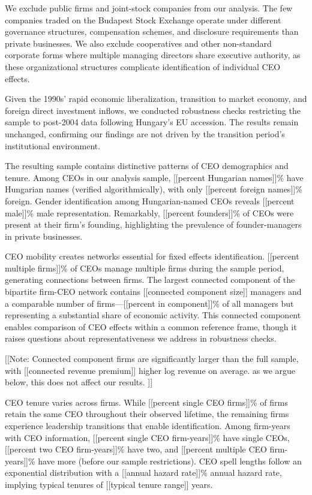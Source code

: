 \documentclass[11pt,a4paper]{article}
\begin{document}
We exclude public firms and joint-stock companies from our analysis. The few companies traded on the Budapest Stock Exchange operate under different governance structures, compensation schemes, and disclosure requirements than private businesses. We also exclude cooperatives and other non-standard corporate forms where multiple managing directors share executive authority, as these organizational structures complicate identification of individual CEO effects.



Given the 1990s' rapid economic liberalization, transition to market economy, and foreign direct investment inflows, we conducted robustness checks restricting the sample to post-2004 data following Hungary's EU accession. The results remain unchanged, confirming our findings are not driven by the transition period's institutional environment.

The resulting sample contains distinctive patterns of CEO demographics and tenure. Among CEOs in our analysis sample, [[percent Hungarian names]]\% have Hungarian names (verified algorithmically), with only [[percent foreign names]]\% foreign. Gender identification among Hungarian-named CEOs reveals [[percent male]]\% male representation. Remarkably, [[percent founders]]\% of CEOs were present at their firm's founding, highlighting the prevalence of founder-managers in private businesses.

CEO mobility creates networks essential for fixed effects identification. [[percent multiple firms]]\% of CEOs manage multiple firms during the sample period, generating connections between firms. The largest connected component of the bipartite firm-CEO network contains [[connected component size]] managers and a comparable number of firms—[[percent in component]]\% of all managers but representing a substantial share of economic activity. This connected component enables comparison of CEO effects within a common reference frame, though it raises questions about representativeness we address in robustness checks.

[[Note: Connected component firms are significantly larger than the full sample, with [[connected revenue premium]] higher log revenue on average. as we argue below, this does not affect our results. ]]

CEO tenure varies across firms. While [[percent single CEO firms]]\% of firms retain the same CEO throughout their observed lifetime, the remaining firms experience leadership transitions that enable identification. Among firm-years with CEO information, [[percent single CEO firm-years]]\% have single CEOs, [[percent two CEO firm-years]]\% have two, and [[percent multiple CEO firm-years]]\% have more (before our sample restrictions). CEO spell lengths follow an exponential distribution with a [[annual hazard rate]]\% annual hazard rate, implying typical tenures of [[typical tenure range]] years.
\end{document}
